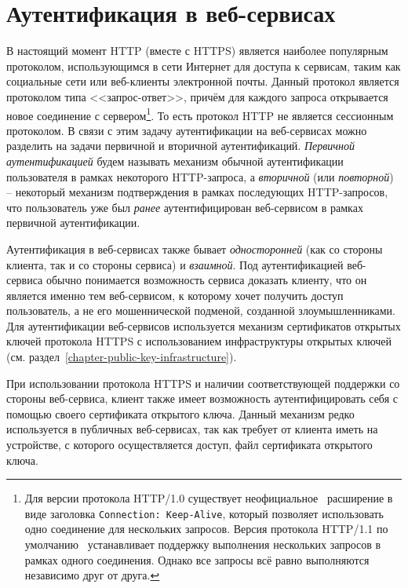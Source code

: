 \section{Аутентификация в веб-сервисах}

В настоящий момент HTTP (вместе с HTTPS) является наиболее популярным протоколом, использующимся в сети Интернет для доступа к сервисам, таким как социальные сети или веб-клиенты электронной почты. Данный протокол является протоколом типа <<запрос-ответ>>, причём для каждого запроса открывается новое соединение с сервером\footnote{Для версии протокола HTTP/1.0 существует неофициальное~\cite[p.~17]{Totty:2002} расширение в виде заголовка \texttt{Connection: Keep-Alive}, который позволяет использовать одно соединение для нескольких запросов. Версия протокола HTTP/1.1 по умолчанию~\cite[6.3.~Persistence]{rfc7230} устанавливает поддержку выполнения нескольких запросов в рамках одного соединения. Однако все запросы всё равно выполняются независимо друг от друга.}. То есть протокол HTTP не является сессионным протоколом. В связи с этим задачу аутентификации на веб-сервисах можно разделить на задачи первичной и вторичной аутентификаций. \emph{Первичной аутентификацией} будем называть механизм обычной аутентификации пользователя в рамках некоторого HTTP-запроса, а \emph{вторичной} (или \emph{повторной}) -- некоторый механизм подтверждения в рамках последующих HTTP-запросов, что пользователь уже был \emph{ранее} аутентифицирован веб-сервисом в рамках первичной аутентификации.

Аутентификация в веб-сервисах также бывает \emph{односторонней} (как со стороны клиента, так и со стороны сервиса) и \emph{взаимной}. Под аутентификацией веб-сервиса обычно понимается возможность сервиса доказать клиенту, что он является именно тем веб-сервисом, к которому хочет получить доступ пользователь, а не его мошеннической подменой, созданной злоумышленниками. Для аутентификации веб-сервисов используется механизм сертификатов открытых ключей протокола HTTPS с использованием инфраструктуры открытых ключей (см. раздел~\ref{chapter-public-key-infrastructure}).

При использовании протокола HTTPS и наличии соответствующей поддержки со стороны веб-сервиса, клиент также имеет возможность аутентифицировать себя с помощью своего сертификата открытого ключа. Данный механизм редко используется в публичных веб-сервисах, так как требует от клиента иметь на устройстве, с которого осуществляется доступ, файл сертификата открытого ключа.

